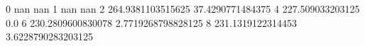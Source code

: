 0 nan nan
1 nan nan
2 264.9381103515625 37.4290771484375
4 227.509033203125 0.0
6 230.2809600830078 2.7719268798828125
8 231.1319122314453 3.6228790283203125
